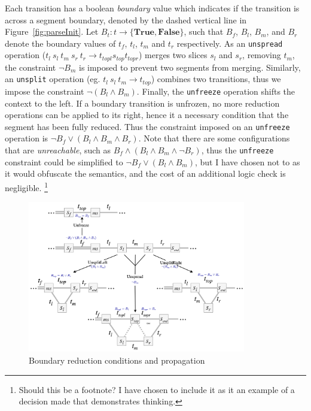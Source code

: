 \documentclass[12pt,a4paper,twoside,openright]{report}
\theoremstyle{definition}
\begin{document}
Each transition has a boolean \textit{boundary} value which indicates if the transition is across a segment boundary, denoted by the dashed vertical line in Figure~\ref{fig:parseInit}. 
Let $B_t : t \to \{\textbf{True}, \textbf{False}\}$, such that $B_f$, $B_l$, $B_m$, and $B_r$ denote the boundary values of $t_f$, $t_l$, $t_m$ and $t_r$ respectively. 
As an \texttt{unspread} operation ($t_l~s_l~t_m~s_r~t_r \to t_{topl} s_{top} t_{topr} $) merges two slices $s_l$ and $s_r$, removing $t_m$, the constraint $\lnot B_m$ is imposed to prevent two segments from merging. 
Similarly, an \texttt{unsplit} operation (eg. $t_l~s_l~t_m \to t_{top}$) combines two transitions, thus we impose the constraint $\lnot (B_l \wedge B_m)$. 
Finally, the \texttt{unfreeze} operation shifts the context to the left. If a boundary transition is unfrozen, no more reduction operations can be applied to its right, hence it a necessary condition that the segment has been fully reduced. Thus the constraint imposed on an \texttt{unfreeze} operation is $\lnot B_f \vee (B_l \wedge B_m \wedge B_r)$. Note that there are some configurations that are \textit{unreachable}, such as $B_f \wedge (B_l \wedge B_m \wedge \lnot B_r)$, thus the \texttt{unfreeze} constraint could be simplified to $\lnot B_f \vee (B_l \wedge B_m)$, but I have chosen not to as it would obfuscate the semantics, and the cost of an additional logic check is negligible. \footnote{Should this be a footnote? I have chosen to include it as it an example of a decision made that demonstrates thinking.}

\begin{figure}[h]
  \centering
  \includegraphics[width=0.85\textwidth]{impl/boundarydiagram/diag.png}
  \caption{Boundary reduction conditions and propagation}
  \label{fig:parseStateOptions}
\end{figure}
\end{document}
